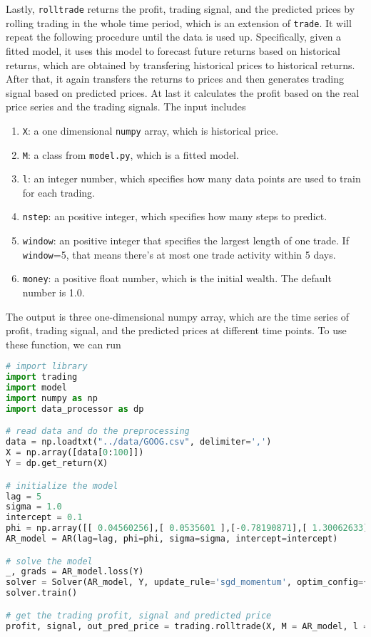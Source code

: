 Lastly, \texttt{rolltrade} returns the profit, trading signal, and the predicted prices by rolling trading in the whole time period, which is an extension of \texttt{trade}. It will repeat the following procedure until the data is used up. Specifically, given a fitted model, it uses this model to forecast future returns based on historical returns, which are obtained by transfering historical prices 
to historical returns. After that, it again transfers the returns to prices and then generates trading signal 
based on predicted prices. At last it calculates the profit based on the real price series and the trading signals. The input includes
\begin{enumerate}
	\item \texttt{X}: a one dimensional \texttt{numpy} array, which is historical price.
	\item \texttt{M}: a class from \texttt{model.py}, which is a fitted model.
	\item \texttt{l}: an integer number, which specifies how many data points are used to train for each trading.
	\item \texttt{nstep}: an positive integer, which specifies how many steps to predict.
	\item \texttt{window}: an positive integer that specifies the largest length of one trade. If \texttt{window}=5, that means there's at most one trade activity within 5 days. 
	\item \texttt{money}: a positive float number, which is the initial wealth. The default number is 1.0.
\end{enumerate}
The output is three one-dimensional numpy array, which are the time series of profit, trading signal, and the predicted prices at different time points.
To use these function, we can run 
\begin{lstlisting}[language=Python]
# import library
import trading 
import model
import numpy as np
import data_processor as dp

# read data and do the preprocessing
data = np.loadtxt("../data/GOOG.csv", delimiter=',')
X = np.array([data[0:100]])
Y = dp.get_return(X)

# initialize the model
lag = 5
sigma = 1.0
intercept = 0.1
phi = np.array([[ 0.04560256],[ 0.0535601 ],[-0.78190871],[ 1.30062633],[ 0.46616754]])
AR_model = AR(lag=lag, phi=phi, sigma=sigma, intercept=intercept)

# solve the model
_, grads = AR_model.loss(Y)
solver = Solver(AR_model, Y, update_rule='sgd_momentum', optim_config={'learning_rate': 1e-6,}, num_epochs=10000, batch_size=1,print_every=10)
solver.train()

# get the trading profit, signal and predicted price
profit, signal, out_pred_price = trading.rolltrade(X, M = AR_model, l = 100, nstep = 20, window = 5, money = 100) 
\end{lstlisting}